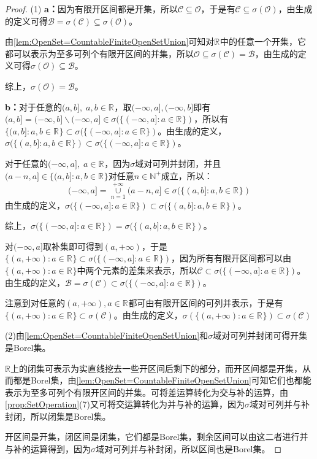 \begin{proof}
	(1) \textbf{a：}因为有限开区间都是开集，所以$\mathcal{C}\subseteq\mathcal{O}$，于是有$\mathcal{C}\subseteq\sigma(\mathcal{O})$，由生成的定义可得$\mathcal{B}=\sigma(\mathcal{C})\subseteq\sigma(\mathcal{O})$。\par
	由\cref{lem:OpenSet=CountableFiniteOpenSetUnion}可知对$\mathbb{R}^{}$中的任意一个开集，它都可以表示为至多可列个有限开区间的并集，所以$\mathcal{O}\subseteq\sigma(\mathcal{C})=\mathcal{B}$，由生成的定义可得$\sigma(\mathcal{O})\subseteq\mathcal{B}$。\par
	综上，$\sigma(\mathcal{O})=\mathcal{B}$。\par
	\textbf{b：}对于任意的$(a,b],\;a,b\in\mathbb{R}^{}$，取$(-\infty,a],(-\infty,b]$即有$(a,b]=(-\infty,b]\backslash(-\infty,a]\in\sigma(\{(-\infty,a]:a\in\mathbb{R}^{}\})$，所以有$\{(a,b]:a,b\in\mathbb{R}^{}\}\subset\sigma(\{(-\infty,a]:a\in\mathbb{R}^{}\})$。由生成的定义，$\sigma(\{(a,b]:a,b\in\mathbb{R}^{}\})\subset\sigma(\{(-\infty,a]:a\in\mathbb{R}^{}\})$。\par
	对于任意的$(-\infty,a],\;a\in\mathbb{R}^{}$，因为$\sigma$域对可列并封闭，并且$(a-n,a]\in\{(a,b]:a,b\in\mathbb{R}^{}\}$对任意$n\in\mathbb{N}^+$成立，所以：
	\begin{equation*}
		(-\infty,a]=\underset{n=1}{\overset{+\infty}{\cup}}(a-n,a]\in\sigma(\{(a,b]:a,b\in\mathbb{R}^{}\})
	\end{equation*}
	由生成的定义，$\sigma(\{(-\infty,a]:a\in\mathbb{R}^{}\})\subset\sigma(\{(a,b]:a,b\in\mathbb{R}^{}\})$。\par
	综上，$\sigma(\{(-\infty,a]:a\in\mathbb{R}^{}\})=\sigma(\{(a,b]:a,b\in\mathbb{R}^{}\})$。\par
	对$(-\infty,a]$取补集即可得到$(a,+\infty)$，于是$\{(a,+\infty):a\in\mathbb{R}^{}\}\subset\sigma(\{(-\infty,a]:a\in\mathbb{R}^{}\})$，因为所有有限开区间都可以由$\{(a,+\infty):a\in\mathbb{R}^{}\}$中两个元素的差集来表示，所以$\mathcal{C}\subset\sigma(\{(-\infty,a]:a\in\mathbb{R}^{}\})$。由生成的定义，$\mathcal{B}=\sigma(\mathcal{C})\subset\sigma(\{(-\infty,a]:a\in\mathbb{R}^{}\})$。\par
	注意到对任意的$(a,+\infty),a\in\mathbb{R}^{}$都可由有限开区间的可列并表示，于是有$\{(a,+\infty):a\in\mathbb{R}^{}\}\subset\sigma(\mathcal{C})$。由生成的定义，$\sigma(\{(a,+\infty):a\in\mathbb{R}^{}\})\subset\sigma(\mathcal{C})$\par
	(2)由\cref{lem:OpenSet=CountableFiniteOpenSetUnion}和$\sigma$域对可列并封闭可得开集是Borel集。\par
	$\mathbb{R}$上的闭集可表示为实直线挖去一些开区间后剩下的部分，而开区间都是开集，从而都是Borel集，由\cref{lem:OpenSet=CountableFiniteOpenSetUnion}可知它们也都能表示为至多可列个有限开区间的并集。可将差运算转化为交与补的运算，由\cref{prop:SetOperation}(7)又可将交运算转化为并与补的运算，因为$\sigma$域对可列并与补封闭，所以闭集是Borel集。\par
	开区间是开集，闭区间是闭集，它们都是Borel集，剩余区间可以由这二者进行并与补的运算得到，因为$\sigma$域对可列并与补封闭，所以区间也是Borel集。
\end{proof}
